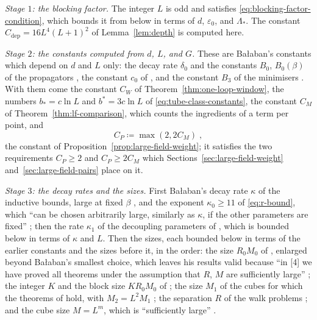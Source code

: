 \documentclass[11pt]{preprint}
\numberwithin{equation}{section}
\theoremstyle{definition}
\theoremstyle{remark}
\theoremstyle{plain}
\begin{document}
\emph{Stage $1$: the blocking factor.} The integer $L$ is odd and satisfies \eqref{eq:blocking-factor-condition}, which bounds it from below in terms of $d$, $\varepsilon_0$, and $\Lambda_*$. The constant $C_{\mathrm{dep}} = 16L^4(L + 1)^2$ of Lemma~\ref{lem:depth} is computed here.

\emph{Stage $2$: the constants computed from $d$, $L$, and $G$.} These are Ba{\l}aban's constants which depend on $d$ and $L$ only: the decay rate $\delta_0$ and the constants $B_0$, $B_0(\beta)$ of the propagators \cite[Theorem~3.1, (3.42), (3.43), p.~397]{BalabanPBG}, the constant $c_0$ of \cite[(2.58)]{BalabanPRT2}, and the constant $B_3$ of the minimisers \cite[Theorem~1, p.~279]{BalabanVAR}. With them come the constant $C_W$ of Theorem~\ref{thm:one-loop-window}, the numbers $b_* = c\ln L$ and $b^* = 3c\ln L$ of \eqref{eq:tube-class-constants}, the constant $C_M$ of Theorem~\ref{thm:lf-comparison}, which counts the ingredients of a term per point, and
\begin{equation}\label{eq:history-constant}
    C_P \coloneqq \max(2, 2C_M)\;,
\end{equation}
the constant of Proposition~\ref{prop:large-field-weight}; it satisfies the two requirements $C_P \geq 2$ and $C_P \geq 2C_M$ which Sections~\ref{sec:large-field-weight} and~\ref{sec:large-field-pairs} place on it.

\emph{Stage $3$: the decay rates and the sizes.} First Ba{\l}aban's decay rate $\kappa$ of the inductive bounds, large at fixed $\beta$ \cite[p.~260]{BalabanCRE}, and the exponent $\kappa_0 \geq 11$ of \eqref{eq:r-bound}, which ``can be chosen arbitrarily large, similarly as $\kappa$, if the other parameters are fixed'' \cite[p.~260]{BalabanCRE}; then the rate $\kappa_1$ of the decoupling parameters of \cite{BalabanRG2}, which is bounded below in terms of $\kappa$ and $L$. Then the sizes, each bounded below in terms of the earlier constants and the sizes before it, in the order: the size $R_0M_0$ of \cite[p.~408]{BalabanPBG}, enlarged beyond Ba{\l}aban's smallest choice, which leaves his results valid because ``in [4] we have proved all theorems under the assumption that $R$, $M$ are sufficiently large'' \cite[p.~408]{BalabanPBG}; the integer $K$ and the block size $KR_0M_0$ of \cite{BalabanPBG}; the size $M_1$ of the cubes for which the theorems of \cite{BalabanPBG,BalabanVAR,BalabanREG} hold, with $M_2 = L^2M_1$ \cite[p.~245]{BalabanCRE}; the separation $R$ of the walk problems \cite[(2.2)]{BalabanPRT2}; and the cube size $M = L^m$, which is ``sufficiently large'' \cite[p.~245]{BalabanCRE}.
\end{document}
